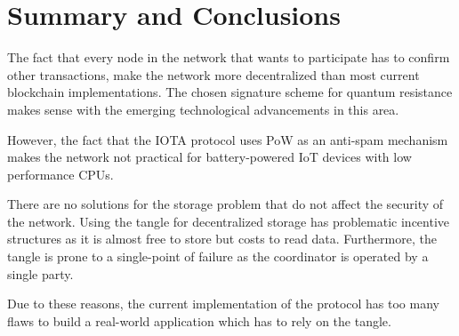 \chapter{Summary and Conclusions}

The fact that every node in the network that wants to participate has to confirm other transactions, make the network more decentralized than most current blockchain implementations. The chosen signature scheme for quantum resistance makes sense with the emerging technological advancements in this area. 

However, the fact that the IOTA protocol uses PoW as an anti-spam mechanism makes the network not practical for battery-powered IoT devices with low performance CPUs. 

There are no solutions for the storage problem that do not affect the security of the network. Using the tangle for decentralized storage has problematic incentive structures as it is almost free to store but costs to read data. Furthermore, the tangle is prone to a single-point of failure as the coordinator is operated by a single party.

Due to these reasons, the current implementation of the protocol has too many flaws to build a real-world application which has to rely on the tangle.
